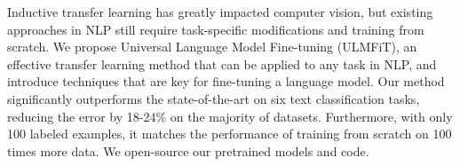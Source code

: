 Inductive transfer learning has greatly impacted computer vision, but existing approaches in NLP still require task-specific modifications and training from scratch. We propose Universal Language Model Fine-tuning (ULMFiT), an effective transfer learning method that can be applied to any task in NLP, and introduce techniques that are key for fine-tuning a language model. Our method significantly outperforms the state-of-the-art on six text classification tasks, reducing the error by 18-24\% on the majority of datasets. Furthermore, with only 100 labeled examples, it matches the performance of training from scratch on 100 times more data. We open-source our pretrained models and code.
